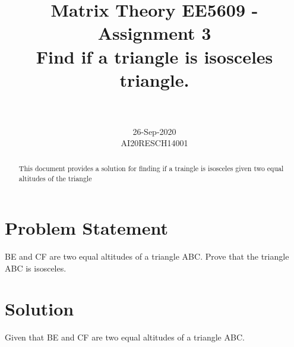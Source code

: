 \documentclass[journal,12pt,twocolumn]{IEEEtran}
\begin{document}
\title{Matrix Theory EE5609 - Assignment 3\\
Find if a triangle is isosceles triangle.
}

\author{\\
 \\
26-Sep-2020\\
AI20RESCH14001\\
 }

\maketitle
\begin{abstract}
This document provides a solution for finding if a traingle is isosceles given two equal altitudes of the triangle
\end{abstract}

\section{Problem Statement}
BE and CF are two equal altitudes of a triangle ABC. Prove that the triangle ABC is isosceles.


\section{Solution}
Given that BE and CF are two equal altitudes of a triangle ABC.

\captionsetup{justification=centering}
\end{document}
